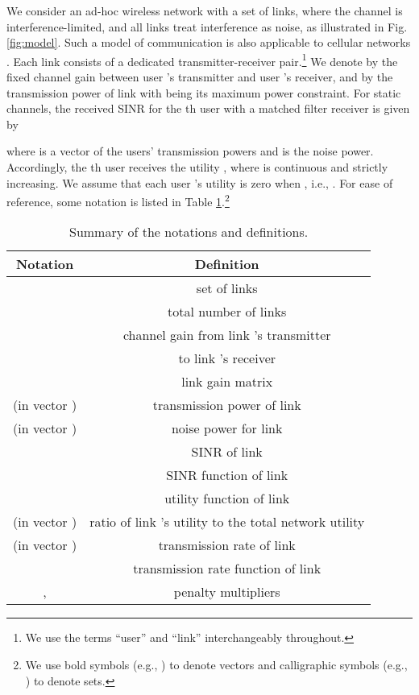 \documentclass[10pt,journal,letterpaper,compsoc]{IEEEtran}
\begin{document}
We consider an ad-hoc wireless network with a set  of links, where the channel is interference-limited, and all  links treat interference as noise, as illustrated in Fig. \ref{fig:model}. Such a model of communication is also applicable to cellular networks \cite{chiang:2008}. Each link consists of a dedicated transmitter-receiver pair.\footnote{We use the terms ``user'' and ``link'' interchangeably throughout.} We denote by  the fixed channel gain between user 's transmitter and user 's receiver, and by  the transmission power of link  with  being its maximum power constraint. For static channels, the received SINR for the th user with a matched filter receiver is given by

where  is a vector of the users' transmission powers and  is the noise power. Accordingly, the th user receives the utility , where  is continuous and strictly increasing. We assume that each user 's utility is zero when , i.e., . For ease of reference, some notation is listed in Table \ref{tab:notations}.\footnote{We use bold symbols (e.g., ) to denote vectors and calligraphic symbols (e.g., ) to denote sets.}



\begin{table}
\centering
\begin{tabular}{|c|c|}
\hline
\textbf{Notation} & \textbf{Definition}\\
\hline
 & set of links\\
\hline
 & total number of links \\
\hline
\multirow{2}{*}{} & channel gain from link 's transmitter\\
& to link 's receiver\\
\hline
 & link gain matrix\\
\hline
 (in vector ) & transmission power of link \\
\hline
 (in vector ) & noise power for link \\
\hline
 & SINR of link \\
\hline
 & SINR function of link \\
\hline
 & utility function of link \\
\hline
 (in vector ) & ratio of link 's utility to the total network utility\\
\hline
 (in vector ) & transmission rate of link \\
\hline
 & transmission rate function of link \\
\hline
,  & penalty multipliers\\
\hline
\end{tabular}
\caption{Summary of the notations and definitions.}\label{tab:notations}
\end{table}
\end{document}

